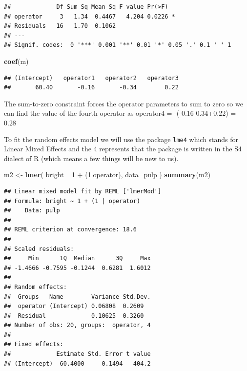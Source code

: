 \documentclass[]{book}
\newenvironment{Shaded}{\begin{snugshade}}{\end{snugshade}}
\newcommand{\KeywordTok}[1]{\textcolor[rgb]{0.13,0.29,0.53}{\textbf{{#1}}}}
\newcommand{\DataTypeTok}[1]{\textcolor[rgb]{0.13,0.29,0.53}{{#1}}}
\newcommand{\DecValTok}[1]{\textcolor[rgb]{0.00,0.00,0.81}{{#1}}}
\newcommand{\StringTok}[1]{\textcolor[rgb]{0.31,0.60,0.02}{{#1}}}
\newcommand{\NormalTok}[1]{{#1}}
\theoremstyle{definition}
\theoremstyle{definition}
\theoremstyle{remark}
\begin{document}
\begin{verbatim}
##             Df Sum Sq Mean Sq F value Pr(>F)  
## operator     3   1.34  0.4467   4.204 0.0226 *
## Residuals   16   1.70  0.1062                 
## ---
## Signif. codes:  0 '***' 0.001 '**' 0.01 '*' 0.05 '.' 0.1 ' ' 1
\end{verbatim}

\begin{Shaded}
\begin{Highlighting}[]
\KeywordTok{coef}\NormalTok{(m)}
\end{Highlighting}
\end{Shaded}

\begin{verbatim}
## (Intercept)   operator1   operator2   operator3 
##       60.40       -0.16       -0.34        0.22
\end{verbatim}

The sum-to-zero constraint forces the operator parameters to sum to zero
so we can find the value of the fourth operator as operator4 =
-(-0.16-0.34+0.22) = 0.28

To fit the random effects model we will use the package \texttt{lme4}
which stands for Linear Mixed Effects and the 4 represents that the
package is written in the S4 dialect of R (which means a few things will
be new to us).

\begin{Shaded}
\begin{Highlighting}[]
\NormalTok{m2 <-}\StringTok{ }\KeywordTok{lmer}\NormalTok{( bright ~}\StringTok{ }\DecValTok{1} \NormalTok{+}\StringTok{ }\NormalTok{(}\DecValTok{1}\NormalTok{|operator), }\DataTypeTok{data=}\NormalTok{pulp )}
\KeywordTok{summary}\NormalTok{(m2)}
\end{Highlighting}
\end{Shaded}

\begin{verbatim}
## Linear mixed model fit by REML ['lmerMod']
## Formula: bright ~ 1 + (1 | operator)
##    Data: pulp
## 
## REML criterion at convergence: 18.6
## 
## Scaled residuals: 
##     Min      1Q  Median      3Q     Max 
## -1.4666 -0.7595 -0.1244  0.6281  1.6012 
## 
## Random effects:
##  Groups   Name        Variance Std.Dev.
##  operator (Intercept) 0.06808  0.2609  
##  Residual             0.10625  0.3260  
## Number of obs: 20, groups:  operator, 4
## 
## Fixed effects:
##             Estimate Std. Error t value
## (Intercept)  60.4000     0.1494   404.2
\end{verbatim}
\end{document}

